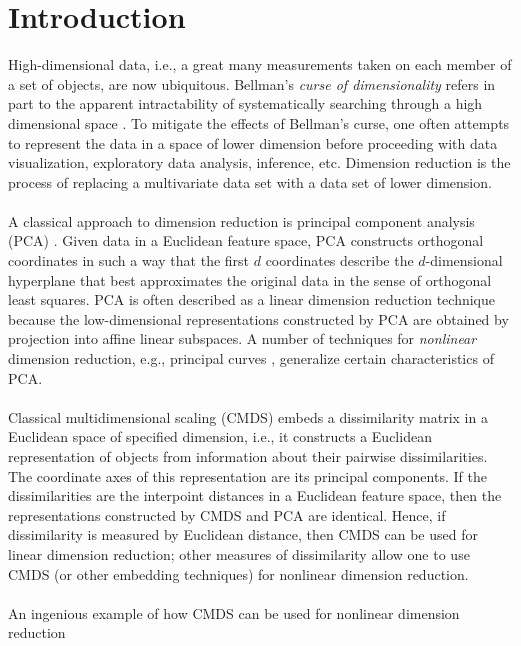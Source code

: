 \documentclass[10pt,twocolumn]{article}
\numberwithin{equation}{section}
\begin{document}
\section{Introduction}
\label{sec:introduction}
High-dimensional data, i.e., a great many measurements taken on each member
of a set of objects, are now ubiquitous.
Bellman's {\em curse of dimensionality}\/ refers in part to
the apparent intractability of systematically searching through a high
dimensional space \cite{donoho00:_high}. To mitigate the effects of 
Bellman's curse, one often attempts to represent the data in a space
of lower dimension before proceeding with data visualization,
exploratory data analysis, inference, etc.  Dimension reduction is
the process of replacing a multivariate data set with a data set
of lower dimension.
 \\ \\
%
\noindent
A classical approach to dimension reduction is principal component
analysis (PCA) \citep{pearson01:_on,hotelling33:_analy}.  Given data
in a Euclidean feature space, PCA constructs orthogonal coordinates
in such a way that the first $d$ coordinates describe the $d$-dimensional
hyperplane that best approximates the original data in the sense 
of orthogonal least squares.  PCA is often described as a linear
dimension reduction technique because the low-dimensional representations
constructed by PCA are obtained by projection into affine linear subspaces.
A number of techniques for {\em nonlinear}\/ dimension reduction, e.g.,
principal curves \citep{hastie&stuetzle:1989}, 
generalize certain characteristics of PCA. \\ \\
%
\noindent
Classical multidimensional scaling (CMDS)
\citep{torgesen52:_multid,gower66:_some} embeds a dissimilarity matrix
in a Euclidean space of specified dimension, i.e., it constructs a
Euclidean representation of objects from information about their
pairwise dissimilarities.  The coordinate axes of this representation
are its principal components.  If the dissimilarities are the
interpoint distances in a Euclidean feature space, then the
representations constructed by CMDS and PCA are identical.  Hence, if
dissimilarity is measured by Euclidean distance, then CMDS can be used
for linear dimension reduction; other measures of dissimilarity allow
one to use CMDS (or other embedding techniques)
for nonlinear dimension reduction.  \\ \\
%
\noindent
An ingenious example of how CMDS can be used for nonlinear dimension reduction
\end{document}
